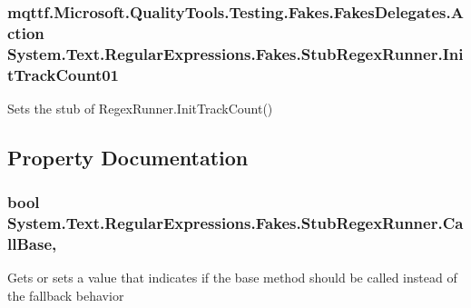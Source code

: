 \hypertarget{class_system_1_1_text_1_1_regular_expressions_1_1_fakes_1_1_stub_regex_runner_a7ee6c3f145dff046c0d2a33f38f2eca4}{
\subsubsection[{Init\-Track\-Count01}]{\setlength{\rightskip}{0pt plus 5cm}mqttf.\-Microsoft.\-Quality\-Tools.\-Testing.\-Fakes.\-Fakes\-Delegates.\-Action System.\-Text.\-Regular\-Expressions.\-Fakes.\-Stub\-Regex\-Runner.\-Init\-Track\-Count01}}\label{class_system_1_1_text_1_1_regular_expressions_1_1_fakes_1_1_stub_regex_runner_a7ee6c3f145dff046c0d2a33f38f2eca4}


Sets the stub of Regex\-Runner.\-Init\-Track\-Count()



\subsection{Property Documentation}
\hypertarget{class_system_1_1_text_1_1_regular_expressions_1_1_fakes_1_1_stub_regex_runner_a7d4df0fccd115db34edcf278d0f9ad35}{
\subsubsection[{Call\-Base}]{\setlength{\rightskip}{0pt plus 5cm}bool System.\-Text.\-Regular\-Expressions.\-Fakes.\-Stub\-Regex\-Runner.\-Call\-Base\hspace{0.3cm}{\ttfamily [get]}, {\ttfamily [set]}}}\label{class_system_1_1_text_1_1_regular_expressions_1_1_fakes_1_1_stub_regex_runner_a7d4df0fccd115db34edcf278d0f9ad35}


Gets or sets a value that indicates if the base method should be called instead of the fallback behavior

